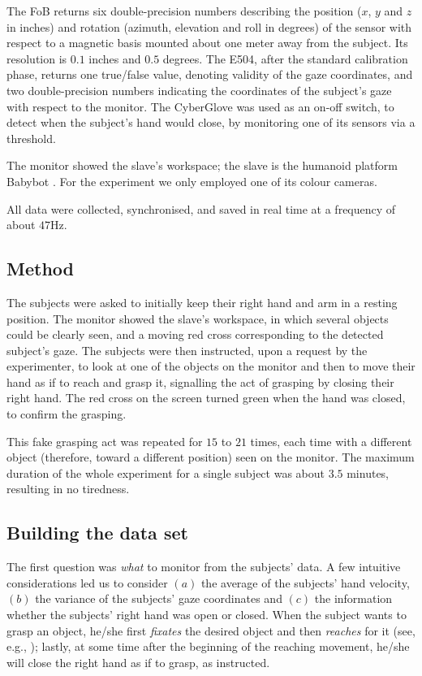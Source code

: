 \documentclass[jou,a4paper,notxfonts]{apa}
\begin{document}
The FoB returns six double-precision numbers describing the position
($x$, $y$ and $z$ in inches) and rotation (azimuth, elevation and roll
in degrees) of the sensor with respect to a magnetic basis mounted
about one meter away from the subject. Its resolution is $0.1$ inches
and $0.5$ degrees. The E504, after the standard calibration phase,
returns one true/false value, denoting validity of the gaze
coordinates, and two double-precision numbers indicating the
coordinates of the subject's gaze with respect to the monitor. The
CyberGlove was used as an on-off switch, to detect when the subject's
hand would close, by monitoring one of its sensors via a threshold.

The monitor showed the slave's workspace; the slave is the humanoid
platform Babybot \cite{babybotHum2005}. For the experiment we only
employed one of its colour cameras.

All data were collected, synchronised, and saved in real time at a
frequency of about $47$Hz.

\subsection{Method}

The subjects were asked to initially keep their right hand and arm in
a resting position. The monitor showed the slave's workspace, in which
several objects could be clearly seen, and a moving red cross
corresponding to the detected subject's gaze. The subjects were then
instructed, upon a request by the experimenter, to look at one of the
objects on the monitor and then to move their hand as if to reach and
grasp it, signalling the act of grasping by closing their right
hand. The red cross on the screen turned green when the hand was
closed, to confirm the grasping.

This fake grasping act was repeated for $15$ to $21$ times, each time
with a different object (therefore, toward a different position) seen
on the monitor. The maximum duration of the whole experiment for a
single subject was about $3.5$ minutes, resulting in no tiredness.

\subsection{Building the data set}
\label{subsec:dataset}

The first question was \emph{what} to monitor from the subjects'
data. A few intuitive considerations led us to consider $(a)$ the
average of the subjects' hand velocity, $(b)$ the variance of the
subjects' gaze coordinates and $(c)$ the information whether the
subjects' right hand was open or closed. When the subject wants to
grasp an object, he/she first \emph{fixates} the desired object and
then \emph{reaches} for it (see, e.g., \cite{johansson01}); lastly, at
some time after the beginning of the reaching movement, he/she will
close the right hand as if to grasp, as instructed.
\end{document}
